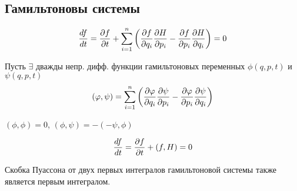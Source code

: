 \documentclass{article}
\begin{document}
\subsection{Гамильтоновы системы}
\[
  \frac{df}{dt}=\frac{\partial{f}}{\partial{t}}+\sum_{i=1}^{n}\left(\frac{\partial{f}}{\partial{q_i}}\frac{\partial{H}}{\partial{p_i}}-\frac{\partial{f}}{\partial{p_i}}\frac{\partial{H}}{\partial{q_i}}\right)=0
\]
\begin{definition}
  Пусть $\exists$ дважды непр. дифф. функции гамильтоновых переменных
  $\phi(q,p,t)$ и $\psi(q,p,t)$
  \[
    (\varphi,\psi)=\sum_{i=1}^{n}\left(\frac{\partial{\varphi}}{\partial{q_i}}\frac{\partial{\psi}}{\partial{p_i}}-\frac{\partial{\varphi}}{\partial{p_i}}\frac{\partial{\psi}}{\partial{q_i}}\right)
  \]
\end{definition}
\begin{remark}
  $(\phi,\phi)=0$, $(\phi,\psi)=-(-\psi,\phi)$
\end{remark}
\begin{theorem}
  \[
    \frac{df}{dt}=\frac{\partial{f}}{\partial{t}}+(f,H)=0
  \]
\end{theorem}
\begin{theorem}
  Скобка Пуассона от двух первых интегралов гамильтоновой системы
  также является первым интегралом.
\end{theorem}
\end{document}
